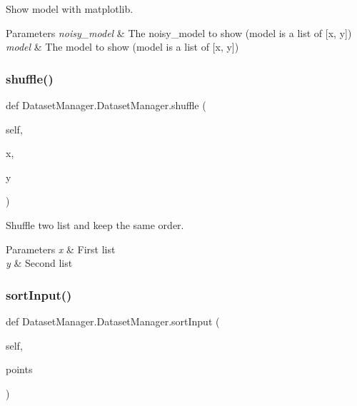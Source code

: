 Show model with matplotlib. 


\begin{DoxyParams}{Parameters}
{\em noisy\+\_\+model} & The noisy\+\_\+model to show (model is a list of \mbox{[}x, y\mbox{]}) \\
\hline
{\em model} & The model to show (model is a list of \mbox{[}x, y\mbox{]}) \\
\hline
\end{DoxyParams}
\mbox{\label{classDatasetManager_1_1DatasetManager_a4f0525d718b6196c7dc922957418ab00}} 
\subsubsection{\texorpdfstring{shuffle()}{shuffle()}}
{\footnotesize\ttfamily def Dataset\+Manager.\+Dataset\+Manager.\+shuffle (\begin{DoxyParamCaption}\item[{}]{self,  }\item[{}]{x,  }\item[{}]{y }\end{DoxyParamCaption})}



Shuffle two list and keep the same order. 


\begin{DoxyParams}{Parameters}
{\em x} & First list \\
\hline
{\em y} & Second list \\
\hline
\end{DoxyParams}
\mbox{\label{classDatasetManager_1_1DatasetManager_a84619ad2806ca24a87c3064f2d7bb23d}} 
\subsubsection{\texorpdfstring{sortInput()}{sortInput()}}
{\footnotesize\ttfamily def Dataset\+Manager.\+Dataset\+Manager.\+sort\+Input (\begin{DoxyParamCaption}\item[{}]{self,  }\item[{}]{points }\end{DoxyParamCaption})}



